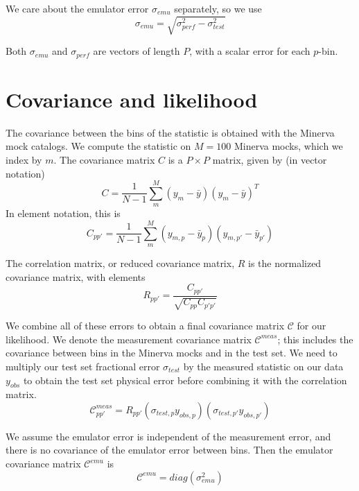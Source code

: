\documentclass[12pt]{article}
\begin{document}
We care about the emulator error $\sigma_{emu}$ separately, so we use
\begin{equation}
    \sigma_{emu} = \sqrt{ \sigma_{perf}^2 - \sigma_{test}^2 }
\end{equation}

Both $\sigma_{emu}$ and $\sigma_{perf}$ are vectors of length $P$, with a scalar error for each $p$-bin. 

\section{Covariance and likelihood}

The covariance between the bins of the statistic is obtained with the Minerva mock catalogs. 
We compute the statistic on $M=100$ Minerva mocks, which we index by $m$. 
The covariance matrix $C$ is a $P \times P$ matrix, given by (in vector notation)
\begin{equation}
C = \frac{1}{N-1} \sum_m^M (y_{m} - \bar{y})(y_{m} - \bar{y})^T
\end{equation}
In element notation, this is
\begin{equation}
C_{pp'} = \frac{1}{N-1} \sum_m^M (y_{m,p} - \bar{y}_{p})(y_{m,p'} - \bar{y}_{p'}) 
\end{equation}

The correlation matrix, or reduced covariance matrix, $R$ is the normalized covariance matrix, with elements
\begin{equation}
R_{pp'} = \frac{C_{pp'}}{\sqrt{ C_{pp} C_{p'p'}}} 
\end{equation}

We combine all of these errors to obtain a final covariance matrix $\mathcal{C}$ for our likelihood.
We denote the measurement covariance matrix $\mathcal{C}^{meas}$; this includes the covariance between bins in the Minerva mocks and in the test set.
We need to multiply our test set fractional error $\sigma_{test}$ by the measured statistic on our data $y_{obs}$ to obtain the test set physical error before combining it with the correlation matrix.
\begin{equation}
    \mathcal{C}_{pp'}^{meas} = R_{pp'} (\sigma_{test,p}y_{obs, p}) (\sigma_{test,p'}y_{obs, p'})
\end{equation}

We assume the emulator error is independent of the measurement error, and there is no covariance of the emulator error between bins.
Then the emulator covariance matrix $\mathcal{C}^{emu}$ is
\begin{equation}
    \mathcal{C}^{emu} = diag(\sigma_{emu}^2)
\end{equation}
\end{document}
